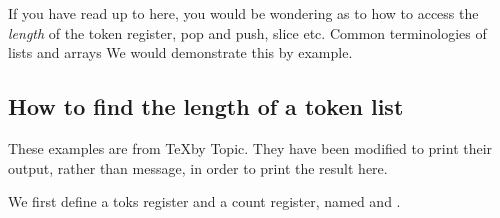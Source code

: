 

\begin{teX}

%
\def\First#1{\expandafter\IgnoreRest\the#1{}\UpToHere}

%
\def\FirstOf#1{\expandafter\expandafter\expandafter
{\expandafter\IgnoreRest\the#1{}\UpToHere}}

%
\def\MoveFirst(#1to#2){#2=\FirstOf{#1}}

%
\def\Rest#1{\expandafter\IgnoreFirst\the#1\relax\UpToHere}

%
\def\RestOf#1{\expandafter\expandafter\expandafter
{\expandafter\IgnoreFirst\the#1\relax\UpToHere}}


\end{teX}

If you have read up to here, you would be wondering as to how to access the \textit{length} of the token register, pop and push, slice etc. Common terminologies of lists and arrays We would demonstrate this by example.



\subsection{How to find the length of a token list}

These examples are from \TeX by Topic. They have been modified to print their
output, rather than message{}, in order to print the result here.


We first define a toks register and a count register, named  and .


